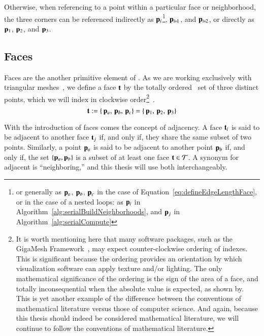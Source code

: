 Otherwise, when referencing to a point within a particular face or neighborhood, the three corners can be referenced indirectly as $\mathbf{p}_i$\footnote{or generally as $\mathbf{p}_a$, $\mathbf{p}_b$, $\mathbf{p}_c$ in the case of Equation~\ref{eq:defineEdgeLengthFace}, or in the case of a nested loops: as $\mathbf{p}_i$ in Algorithm~\ref{alg:serialBuildNeighborhoods}, and $\mathbf{p}_j$ in Algorithm~\ref{alg:serialCompute}}, $\bp_{\sipo}$, and $\bp_{\sipt}$, or directly as $\mathbf{p}_1$, $\mathbf{p}_2$, and $\mathbf{p}_3$.~\cite[p.~25]{Mara12}%
%
%

%
%
%
\subsection{Faces}
\label{ch2s3ssF}
Faces are the another primitive element of \tdd{}. As we are working exclusively with triangular meshes~\cite[p.~26]{Mara12}, we define a face $\mathbf{t}$ by the totally ordered~\cite{Weisstein19a} set of three distinct points, which we will index in clockwise order\footnote{It is worth mentioning here that many software packages, such as the GigaMesh Framework~\cite[p.~89]{Mara12}, may expect counter-clockwise ordering of indexes.  This is significant because the ordering provides an orientation by which visualization software can apply texture and/or lighting. The only mathematical significance of the ordering is the sign of the area of a face, and totally inconsequential when the absolute value is expected, as shown by\cite[p.~2]{Braden86}. This is yet another example of the difference between the conventions of mathematical literature versus those of computer science. And again, because this thesis should indeed be considered mathematical literature, we will continue to follow the conventions of mathematical literature.}~\cite[p.~4]{Mara17}.
%
\begin{equation}
	\mathbf{t} := \left \{\,\mathbf{p}_a,\,\mathbf{p}_b,\,\mathbf{p}_c\right \} = \left \{\,\mathbf{p}_1,\,\mathbf{p}_2,\,\mathbf{p}_3\right \}
	\label{eq:defineSetOfFaces}
\end{equation}

With the introduction of faces comes the concept of adjacency. A face $\mathbf{t}_i$ is said to be adjacent to another face $\mathbf{t}_j$ if, and only if, they share the same subset of two points. Similarly, a point $\mathbf{p}_a$ is said to be adjacent to another point $\mathbf{p}_b$ if, and only if, the set $\{\mathbf{p}_a, \mathbf{p}_b\}$ is a subset of at least one face $\mathbf{t} \in \mathcal{T}$. A synonym for adjacent is ``neighboring,'' and this thesis will use both interchangeably. 

